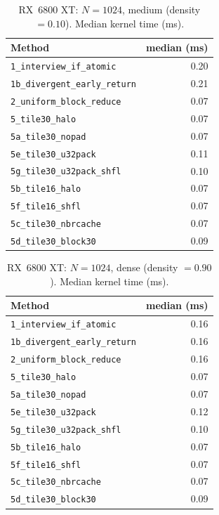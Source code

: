 \documentclass[11pt,a4paper]{article}
\begin{document}
\begin{table}[htbp]
  \centering
  \footnotesize
  \caption{RX~6800 XT: $N=1024$, medium (density $=0.10$). Median kernel time (ms).}
  \label{tab:amd-1024-medium}
  \begin{tabular}{@{}p{5.1cm}r@{}}
    \toprule
    Method & median (ms) \\
    \midrule
    \texttt{1\_interview\_if\_atomic}      & 0.20 \\
    \texttt{1b\_divergent\_early\_return} & 0.21 \\
    \texttt{2\_uniform\_block\_reduce}    & 0.07 \\
    \texttt{5\_tile30\_halo}              & 0.07 \\
    \texttt{5a\_tile30\_nopad}            & 0.07 \\
    \texttt{5e\_tile30\_u32pack}          & 0.11 \\
    \texttt{5g\_tile30\_u32pack\_shfl}    & 0.10 \\
    \texttt{5b\_tile16\_halo}              & 0.07 \\
    \texttt{5f\_tile16\_shfl}             & 0.07 \\
    \texttt{5c\_tile30\_nbrcache}          & 0.07 \\
    \texttt{5d\_tile30\_block30}          & 0.09 \\
    \bottomrule
  \end{tabular}
\end{table}

\begin{table}[htbp]
  \centering
  \footnotesize
  \caption{RX~6800 XT: $N=1024$, dense (density $=0.90$). Median kernel time (ms).}
  \label{tab:amd-1024-dense}
  \begin{tabular}{@{}p{5.1cm}r@{}}
    \toprule
    Method & median (ms) \\
    \midrule
    \texttt{1\_interview\_if\_atomic}      & 0.16 \\
    \texttt{1b\_divergent\_early\_return} & 0.16 \\
    \texttt{2\_uniform\_block\_reduce}    & 0.16 \\
    \texttt{5\_tile30\_halo}              & 0.07 \\
    \texttt{5a\_tile30\_nopad}            & 0.07 \\
    \texttt{5e\_tile30\_u32pack}          & 0.12 \\
    \texttt{5g\_tile30\_u32pack\_shfl}    & 0.10 \\
    \texttt{5b\_tile16\_halo}              & 0.07 \\
    \texttt{5f\_tile16\_shfl}             & 0.07 \\
    \texttt{5c\_tile30\_nbrcache}          & 0.07 \\
    \texttt{5d\_tile30\_block30}          & 0.09 \\
    \bottomrule
  \end{tabular}
\end{table}
\end{document}
